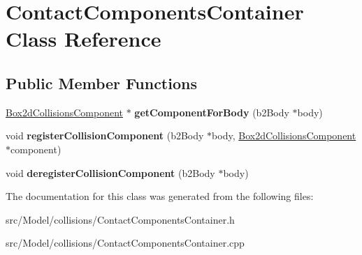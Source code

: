 \hypertarget{classContactComponentsContainer}{}\section{Contact\+Components\+Container Class Reference}
\label{classContactComponentsContainer}
\subsection*{Public Member Functions}
\begin{DoxyCompactItemize}
\item 
\hyperlink{classBox2dCollisionsComponent}{Box2d\+Collisions\+Component} $\ast$ {\bfseries get\+Component\+For\+Body} (b2\+Body $\ast$body)\hypertarget{classContactComponentsContainer_ac17b948c7e104ce75f20795e63fe4194}{}\label{classContactComponentsContainer_ac17b948c7e104ce75f20795e63fe4194}

\item 
void {\bfseries register\+Collision\+Component} (b2\+Body $\ast$body, \hyperlink{classBox2dCollisionsComponent}{Box2d\+Collisions\+Component} $\ast$component)\hypertarget{classContactComponentsContainer_af64b4fb5377ba04e336de1c88231209b}{}\label{classContactComponentsContainer_af64b4fb5377ba04e336de1c88231209b}

\item 
void {\bfseries deregister\+Collision\+Component} (b2\+Body $\ast$body)\hypertarget{classContactComponentsContainer_a2aff9381caf7154d8a301dc43d3feee4}{}\label{classContactComponentsContainer_a2aff9381caf7154d8a301dc43d3feee4}

\end{DoxyCompactItemize}


The documentation for this class was generated from the following files\+:\begin{DoxyCompactItemize}
\item 
src/\+Model/collisions/Contact\+Components\+Container.\+h\item 
src/\+Model/collisions/Contact\+Components\+Container.\+cpp\end{DoxyCompactItemize}
